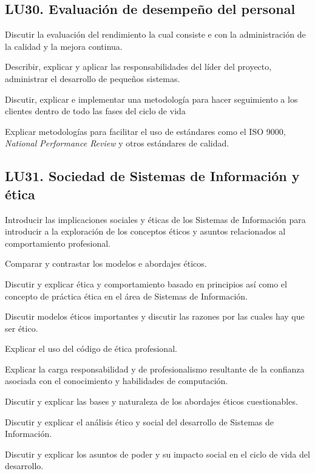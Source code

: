 \subsection{LU30. Evaluación de desempeño del personal}\label{sec:LU30}
\begin{LearningUnit}
\begin{LUGoal}
\item Discutir la evaluación del rendimiento  la cual consiste e con la administración de la calidad  y la mejora continua.
\end{LUGoal}

\begin{LUObjective}
\item Describir, explicar y aplicar las responsabilidades del líder del proyecto, administrar el desarrollo de pequeños sistemas.
\item Discutir, explicar e implementar una metodología para hacer seguimiento a los clientes dentro de todo las fases del ciclo de vida
\item Explicar metodologías para facilitar el uso de estándares como el ISO 9000, {\it National Performance Review} y otros estándares de calidad.
\end{LUObjective}
\end{LearningUnit}

\subsection{LU31. Sociedad de Sistemas de Información y ética}\label{sec:LU31}
\begin{LearningUnit}
\begin{LUGoal}
\item Introducir las implicaciones sociales y éticas de los Sistemas de Información para introducir a la exploración de los conceptos éticos y asuntos relacionados al comportamiento profesional.
\item Comparar y contrastar los modelos e abordajes éticos.
\end{LUGoal}

\begin{LUObjective}
\item Discutir y explicar ética y comportamiento basado en principios así como el concepto de práctica ética en el área de Sistemas de Información.
\item Discutir modelos éticos importantes y discutir las razones por las cuales hay que ser ético.
\item Explicar el uso del código de ética profesional.
\item Explicar la carga responsabilidad y de profesionalismo resultante de la confianza asociada con el conocimiento y habilidades de computación.
\item Discutir y explicar las bases y naturaleza de los abordajes éticos cuestionables.
\item Discutir y explicar el análisis ético y social del desarrollo de Sistemas de Información.
\item Discutir y explicar los asuntos de poder y su impacto social en el ciclo de vida del desarrollo.
\end{LUObjective}
\end{LearningUnit}

